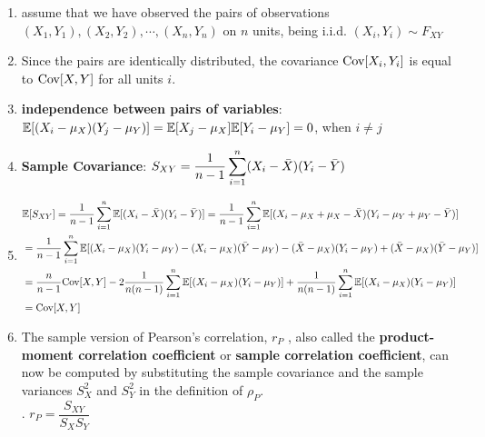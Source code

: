 \begin{enumerate}
    \item assume that we have observed the pairs of observations $(X_1, Y_1), (X_2, Y_2), \cdots , (X_n , Y_n )$ on $n$ units, being i.i.d. $(X_i , Y_i ) \sim F_{X Y}$ 
    \hfill \cite{statistics/book/Statistics-for-Data-Scientists/Maurits-Kaptein}

    \item Since the pairs are identically distributed, the covariance $\text{Cov}[X_i , Y_i]$ is equal to $\text{Cov}[X, Y]$ for all units $i$.
    \hfill \cite{statistics/book/Statistics-for-Data-Scientists/Maurits-Kaptein}

    \item \textbf{independence between pairs of variables}: $\mathbb{E}[(X_i - \mu_X )(Y_j - \mu_Y )] = \mathbb{E}[X_j - \mu_X] \mathbb{E}[Y_i - \mu_Y] = 0$, when $i \neq j$
    \hfill \cite{statistics/book/Statistics-for-Data-Scientists/Maurits-Kaptein}

    \item \textbf{Sample Covariance}: 
    $
        S_{X Y} = \dfrac{1 }{n - 1} \displaystyle\sum^n_{i=1} (X_i - \bar{X})(Y_i - \bar{Y} )
    $
    \hfill \cite{statistics/book/Statistics-for-Data-Scientists/Maurits-Kaptein}

    \item 
    $
        \begin{aligned}
            &\mathbb{E}[S_{X Y}] 
            = \dfrac{1}{n - 1} \displaystyle\sum_{i=1}^n \mathbb{E}[(X_i - \bar{X} )(Y_i - \bar{Y} )]
            = \dfrac{1}{n - 1} \displaystyle\sum_{i=1}^n\mathbb{E}[(X_i - \mu_X + \mu_X - \bar{X})(Y_i - \mu_Y + \mu_Y - \bar{Y} )]  \\
            &= \dfrac{1}{n - 1} \displaystyle\sum_{i=1}^n\mathbb{E}[(X_i - \mu_X )(Y_i - \mu_Y ) - (X_i - \mu_X )( \bar{Y} - \mu_Y ) - ( \bar{X} - \mu_X )(Y_i - \mu_Y ) + ( \bar{X} - \mu_X )( \bar{Y} - \mu_Y )] \\
            &= \dfrac{n}{n - 1} \text{Cov}[X, Y] - 2 \dfrac{1}{n(n - 1)} \displaystyle\sum_{i=1}^n\mathbb{E}[(X_i - \mu_X )(Y_i - \mu_Y )] + \dfrac{1}{n(n - 1)} \displaystyle\sum_{i=1}^n \mathbb{E}[(X_i - \mu_X )(Y_i - \mu_Y )] \\
            &= \text{Cov}[X, Y]
        \end{aligned}
    $
    \hfill \cite{statistics/book/Statistics-for-Data-Scientists/Maurits-Kaptein}

    \item The sample version of Pearson’s correlation, $r_P$ , also called the \textbf{product-moment correlation coefficient} or \textbf{sample correlation coefficient}, can now be computed by substituting the sample covariance and the sample variances $S^2_X$ and $S^2_Y$ in the definition of $\rho_P$.
    \hfill \cite{statistics/book/Statistics-for-Data-Scientists/Maurits-Kaptein}
    \\
    .\hfill
    $
        r_P = \dfrac{S_{X Y} }{S_X S_Y}
    $
    \hfill \cite{statistics/book/Statistics-for-Data-Scientists/Maurits-Kaptein}


\end{enumerate}
